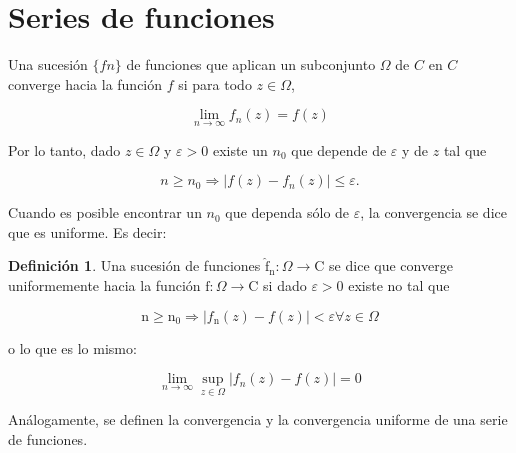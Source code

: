 \documentclass[10pt]{article}
\theoremstyle{plain}
\theoremstyle{definition}
\newtheorem{definition}[theorem]{Definición}
\theoremstyle{remark}
\begin{document}
\section{Series de funciones}
Una sucesión $\{f n\}$ de funciones que aplican un subconjunto $\Omega$ de $C$ en $C$ converge hacia la función $f$ si para todo $z \in \Omega$,

$$
\lim _{n \rightarrow \infty} f_{n}(z)=f(z)
$$

Por lo tanto, dado $z \in \Omega$ y $\varepsilon>0$ existe un $n_{0}$ que depende de $\varepsilon$ y de $z$ tal que

$$
n \geqslant n_{0} \Rightarrow\left|f(z)-f_{n}(z)\right| \leqslant \varepsilon .
$$

Cuando es posible encontrar un $n_{0}$ que dependa sólo de $\varepsilon$, la convergencia se dice que es uniforme. Es decir:

\begin{definition}
Una sucesión de funciones $\hat{\mathrm{f}}_{\mathrm{n}}: \Omega \rightarrow \mathrm{C}$ se dice que converge uniformemente hacia la función $\mathrm{f}: \Omega \rightarrow \mathrm{C}$ si dado $\varepsilon>0$ existe no tal que

$$
\mathrm{n} \geqslant \mathrm{n}_{0} \Rightarrow\left|f_{\mathrm{n}}(z)-f(z)\right|<\varepsilon \forall z \in \Omega
$$

o lo que es lo mismo:

$$
\lim _{n \rightarrow \infty} \sup _{z \in \Omega}\left|f_{n}(z)-f(z)\right|=0
$$
\end{definition}

Análogamente, se definen la convergencia y la convergencia uniforme de una serie de funciones.
\end{document}
